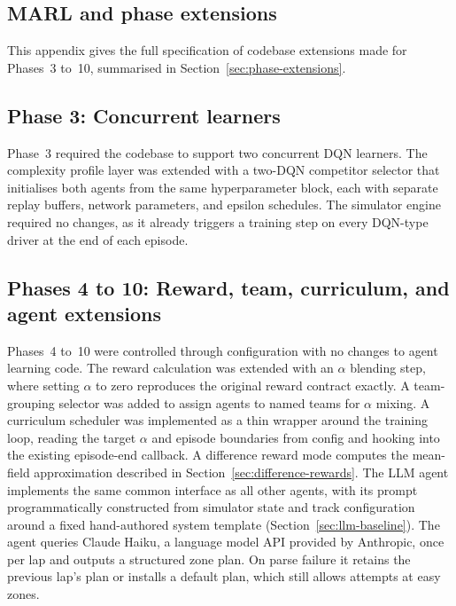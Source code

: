 \begin{appendices}
\chapter{MARL and phase extensions}
\label{appendix:phase-extensions}

This appendix gives the full specification of codebase extensions made for Phases~3 to~10, summarised in Section~\ref{sec:phase-extensions}.

\section{Phase 3: Concurrent learners}

Phase~3 required the codebase to support two concurrent DQN learners. The complexity profile layer was extended with a two-DQN competitor selector that initialises both agents from the same hyperparameter block, each with separate replay buffers, network parameters, and epsilon schedules. The simulator engine required no changes, as it already triggers a training step on every DQN-type driver at the end of each episode.

\section{Phases 4 to 10: Reward, team, curriculum, and agent extensions}

Phases~4 to~10 were controlled through configuration with no changes to agent learning code. The reward calculation was extended with an $\alpha$ blending step, where setting $\alpha$ to zero reproduces the original reward contract exactly. A team-grouping selector was added to assign agents to named teams for $\alpha$ mixing. A curriculum scheduler was implemented as a thin wrapper around the training loop, reading the target $\alpha$ and episode boundaries from config and hooking into the existing episode-end callback. A difference reward mode computes the mean-field approximation described in Section~\ref{sec:difference-rewards}. The LLM agent implements the same common interface as all other agents, with its prompt programmatically constructed from simulator state and track configuration around a fixed hand-authored system template (Section~\ref{sec:llm-baseline}). The agent queries Claude Haiku, a language model API provided by Anthropic, once per lap and outputs a structured zone plan. On parse failure it retains the previous lap's plan or installs a default plan, which still allows attempts at easy zones.



\end{appendices}
